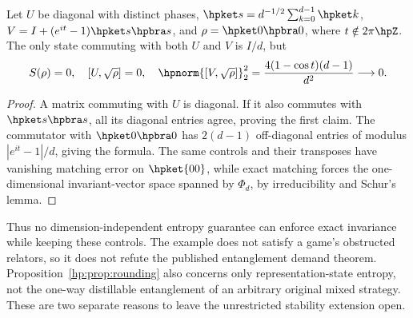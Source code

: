 \begin{proposition}\label{hp:prop:fixed}
Let $U$ be diagonal with distinct phases, $\hpket s=d^{-1/2}\sum_{k=0}^{d-1}\hpket k$, $V=I+(e^{it}-1)\hpket s\hpbra s$, and $\rho=\hpket0\hpbra0$, where $t\notin2\pi\hpZ$. The only state commuting with both $U$ and $V$ is $I/d$, but
\[
 S(\rho)=0,\quad [U,\sqrt\rho]=0,\quad
 \hpnorm{[V,\sqrt\rho]}_2^2=\frac{4(1-\cos t)(d-1)}{d^2}\longrightarrow0.
\]
\end{proposition}
\begin{proof}
A matrix commuting with $U$ is diagonal. If it also commutes with $\hpket s\hpbra s$, all its diagonal entries agree, proving the first claim. The commutator with $\hpket0\hpbra0$ has $2(d-1)$ off-diagonal entries of modulus $|e^{it}-1|/d$, giving the formula. The same controls and their transposes have vanishing matching error on $\hpket{00}$, while exact matching forces the one-dimensional invariant-vector space spanned by $\Phi_d$, by irreducibility and Schur's lemma.
\end{proof}

Thus no dimension-independent entropy guarantee can enforce exact invariance while keeping these controls. The example does not satisfy a game's obstructed relators, so it does not refute the published entanglement demand theorem. Proposition~\ref{hp:prop:rounding} also concerns only representation-state entropy, not the one-way distillable entanglement of an arbitrary original mixed strategy. These are two separate reasons to leave the unrestricted stability extension open.
